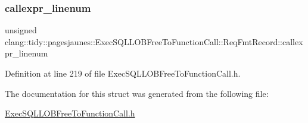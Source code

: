 \subsubsection{\texorpdfstring{callexpr\+\_\+linenum}{callexpr\_linenum}}
{\footnotesize\ttfamily unsigned clang\+::tidy\+::pagesjaunes\+::\+Exec\+S\+Q\+L\+L\+O\+B\+Free\+To\+Function\+Call\+::\+Req\+Fmt\+Record\+::callexpr\+\_\+linenum}



Definition at line 219 of file Exec\+S\+Q\+L\+L\+O\+B\+Free\+To\+Function\+Call.\+h.



The documentation for this struct was generated from the following file\+:\begin{DoxyCompactItemize}
\item 
\hyperlink{_exec_s_q_l_l_o_b_free_to_function_call_8h}{Exec\+S\+Q\+L\+L\+O\+B\+Free\+To\+Function\+Call.\+h}\end{DoxyCompactItemize}
